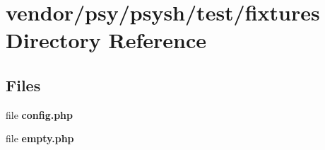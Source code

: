\section{vendor/psy/psysh/test/fixtures Directory Reference}
\label{dir_d99d4cc7489cedf68de024ce82ac2827}
\subsection*{Files}
\begin{DoxyCompactItemize}
\item 
file {\bf config.\+php}
\item 
file {\bf empty.\+php}
\end{DoxyCompactItemize}
